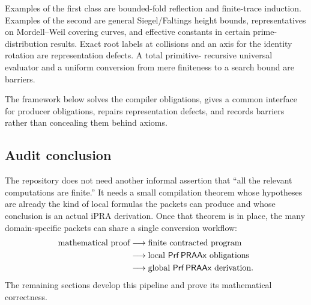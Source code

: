 Examples of the first class are bounded-fold reflection and finite-trace
induction.  Examples of the second are general Siegel/Faltings height bounds,
representatives on Mordell--Weil covering curves, and effective constants in
certain prime-distribution results.  Exact root labels at collisions and an
axis for the identity rotation are representation defects.  A total primitive-
recursive universal evaluator and a uniform conversion from mere finiteness to
a search bound are barriers.

The framework below solves the compiler obligations, gives a common interface
for producer obligations, repairs representation defects, and records barriers
rather than concealing them behind axioms.

\subsection{Audit conclusion}

The repository does not need another informal assertion that ``all the
relevant computations are finite.''  It needs a small compilation theorem
whose hypotheses are already the kind of local formulas the packets can
produce and whose conclusion is an actual iPRA derivation.  Once that theorem
is in place, the many domain-specific packets can share a single conversion
workflow:
\[
\begin{aligned}
\text{mathematical proof}
&\longrightarrow \text{finite contracted program}\\
&\longrightarrow \text{local }\mathsf{Prf}\,\mathsf{PRAAx}\text{ obligations}\\
&\longrightarrow \text{global }\mathsf{Prf}\,\mathsf{PRAAx}\text{ derivation}.
\end{aligned}
\]
The remaining sections develop this pipeline and prove its mathematical
correctness.
